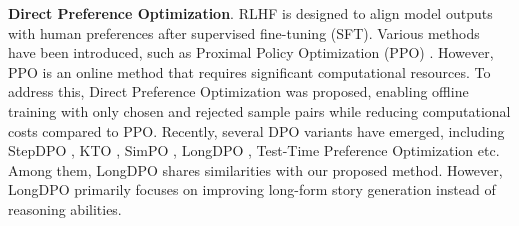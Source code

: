 \textbf{Direct Preference Optimization}. RLHF 
 \cite{chaudhari2024rlhf, kirk2023understanding, kaufmann2023survey} is designed to align model outputs with human preferences after supervised fine-tuning (SFT). Various methods have been introduced, such as Proximal Policy Optimization (PPO) 
 \cite{engstrom2019implementation, huang2022a2c, wijmans2019dd}. However, PPO is an online method that requires significant computational resources. To address this, Direct Preference Optimization was proposed, enabling offline training with only chosen and rejected sample pairs while reducing computational costs compared to PPO. Recently, several DPO variants \cite{wu2024beta,wu2024alpha, qi2024online, zhong2024dpo,su2025reveal} have emerged, including StepDPO \cite{lai2024step}, KTO \cite{ethayarajh2024kto}, SimPO \cite{meng2024simpo}, LongDPO \cite{ping2025longdpo}, Test-Time Preference Optimization \cite{li2025testtimepreferenceoptimizationonthefly} etc. Among them, LongDPO shares similarities with our proposed method. However, LongDPO primarily focuses on improving long-form story generation instead of reasoning abilities.